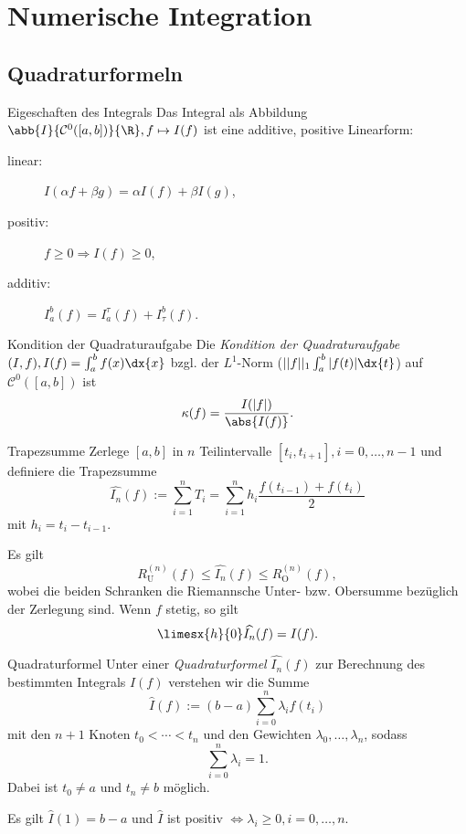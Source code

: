 \section{Numerische Integration}

\subsection*{Quadraturformeln}

\begin{karte}{Eigeschaften des Integrals}
    Das Integral als Abbildung \( \abb{I}{\mathcal{C}^0([a,b])}{\R}, f \mapsto I(f) \) ist 
    eine additive, positive Linearform:
    
    \begin{description}
        \item[linear:] \( I(\alpha f + \beta g) = \alpha I(f) + \beta I(g) \),
        \item[positiv:] \( f\geq 0 \Rightarrow I(f) \geq 0\),
        \item[additiv:] \( I_a^b(f) = I_a^\tau(f) + I_\tau^b(f) \).
    \end{description}
\end{karte}

\begin{karte}{Kondition der Quadraturaufgabe}
    Die \textit{Kondition der Quadraturaufgabe} \( (I,f), I(f) = \int_a^b f(x) \dx{x} \) 
    bzgl. der \( L^1 \)-Norm (\( ||f||_1 \int_a^b |f(t) | \dx{t} \)) auf \( \mathcal{C}^0([a,b]) \) 
    ist 
    \[ \kappa(f) = \frac{I(|f|)}{\abs{I(f)}}. \]
\end{karte}

\begin{karte}{Trapezsumme}
    Zerlege \( [a,b] \) in \( n \) Teilintervalle \( [t_i, t_{i+1}], i = 0, \ldots, n-1 \) 
    und definiere die Trapezsumme
    \[ \widehat{I_n}(f) := \sum_{i=1}^n T_i = \sum_{i=1}^n h_i \frac{f(t_{i-1}) + f(t_i)}{2} \]
    mit \( h_i = t_i - t_{i-1} \).
    
    Es gilt 
    \[ R_\mathrm{U}^{(n)}(f) \leq \widehat{I_n}(f) \leq R_{\mathrm{O}}^{(n)}(f), \]
    wobei die beiden Schranken die Riemannsche Unter- bzw. Obersumme bezüglich der Zerlegung sind.
    Wenn \(f\) stetig, so gilt 
    \[ \limesx{h}{0} \widehat{I_n}(f) = I(f). \]
\end{karte}

\begin{karte}{Quadraturformel}
    Unter einer \textit{Quadraturformel} \( \widehat{I_n}(f) \) zur Berechnung des 
    bestimmten Integrals \( I(f) \) verstehen wir die Summe 
    \[ \widehat{I}(f) := (b-a) \sum_{i=0}^n \lambda_i f(t_i) \]
    mit den \( n+1 \) Knoten \( t_0 < \cdots < t_n \) und den Gewichten \( \lambda_0,\ldots, \lambda_n \), 
    sodass 
    \[ \sum_{i=0}^n \lambda_i = 1. \]
    Dabei ist \( t_0 \neq a \) und \( t_n \neq b \) möglich.

    Es gilt \( \widehat{I}(1) = b-a \) und \( \widehat{I} \) ist positiv \( \Leftrightarrow \lambda_i \geq 0, i = 0,\ldots, n \).
\end{karte}

